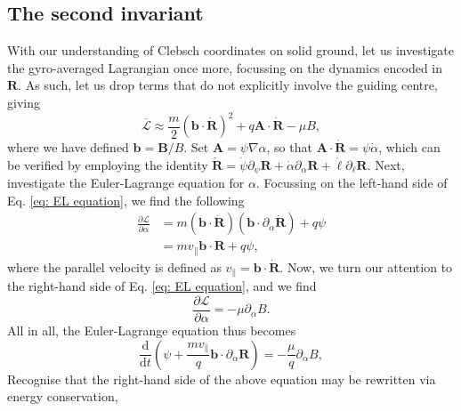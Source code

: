 \subsection{The second invariant}
With our understanding of Clebsch coordinates on solid ground, let us investigate the gyro-averaged Lagrangian once more, focussing on the dynamics encoded in $\boldsymbol{R}$. As such, let us drop terms that do not explicitly involve the guiding centre, giving 
\begin{equation}
    \overline{\mathcal{L}} \approx \frac{m}{2} (\boldsymbol{b} \cdot \dot{\boldsymbol{R}})^2 + q \boldsymbol{A} \cdot \dot{\boldsymbol{R}} - \mu B,
\end{equation}
where we have defined $\boldsymbol{b} = \boldsymbol{B}/B$. Set $\boldsymbol{A} = \psi \nabla \alpha$, so that $\boldsymbol{A} \cdot \dot{\boldsymbol{R}} = \psi \dot{\alpha}$, which can be verified by employing the identity $\dot{\boldsymbol{R}}=\dot{\psi} \partial_\psi \boldsymbol{R} + \dot{\alpha} \partial_\alpha \boldsymbol{R} +\dot{\ell} \partial_\ell \boldsymbol{R}$. Next, investigate the Euler-Lagrange equation for $\alpha$. Focussing on the left-hand side of Eq. \eqref{eq: EL equation}, we find the following
\begin{equation}
\begin{aligned}
    \frac{\partial \mathcal{L}}{\partial \dot{\alpha}} &= m (\boldsymbol{b} \cdot \dot{\boldsymbol{R}}) (\boldsymbol{b} \cdot \partial_{\dot{\alpha}} \dot{\boldsymbol{R}}) + q \psi \\
    &= m v_\parallel \boldsymbol{b} \cdot \boldsymbol{R} + q \psi,
\end{aligned}
\end{equation}
where the parallel velocity is defined as $v_\parallel = \boldsymbol{b} \cdot \dot{\boldsymbol{R}}$. Now, we turn our attention to the right-hand side of Eq. \eqref{eq: EL equation}, and we find
\begin{equation}
    \frac{\partial \mathcal{L}}{\partial \alpha} = - \mu \partial_\alpha B.
\end{equation}
All in all, the Euler-Lagrange equation thus becomes
\begin{equation}
    \frac{\mathrm{d}}{\mathrm{d}t}\left( \psi + \frac{m v_\parallel }{q} \boldsymbol{b} \cdot \partial_\alpha \boldsymbol{R} \right) = - \frac{\mu}{q} \partial_\alpha B,
    \label{eq: euler-lagrange for psi}
\end{equation}
Recognise that the right-hand side of the above equation may be rewritten via energy conservation,
